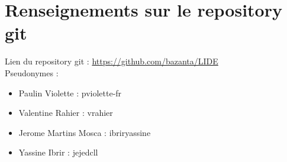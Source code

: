 \chapter{Renseignements sur le repository git}

Lien du repository git :  \url{https://github.com/bazanta/LIDE}
\\Pseudonymes :
\begin{itemize}

	\item Paulin Violette : pviolette-fr
	\item Valentine Rahier : vrahier
	\item Jerome Martins Mosca : ibriryassine
	\item Yassine Ibrir : jejedcll

\end{itemize}
